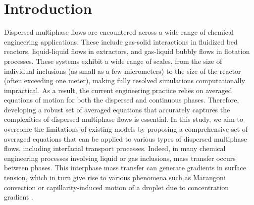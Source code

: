 
\section{Introduction}


Dispersed multiphase flows are encountered across a wide range of chemical engineering applications. 
These include gas-solid interactions in fluidized bed reactors, liquid-liquid flows in extractors, and gas-liquid bubbly flows in flotation processes. 
These systems exhibit a wide range of scales, from the size of individual inclusions (as small as a few micrometers) to the size of the reactor (often exceeding one meter), making fully resolved simulations computationally impractical. 
As a result, the current engineering practice relies on averaged equations of motion for both the dispersed and continuous phases. 
Therefore, developing a robust set of averaged equations that accurately captures the complexities of dispersed multiphase flows is essential. 
In this study, we aim to overcome the limitations of existing models by proposing a comprehensive set of averaged equations that can be applied to various types of dispersed multiphase flows, including interfacial transport processes.
Indeed, in many chemical engineering processes involving liquid or gas inclusions, mass transfer occurs between phases. 
This interphase mass transfer can generate gradients in surface tension, which in turn give rise to various phenomena such as Marangoni convection \citep{wegener2014fluid} or capillarity-induced motion of a droplet due to concentration gradient \citep{Subramanian_1985}.

